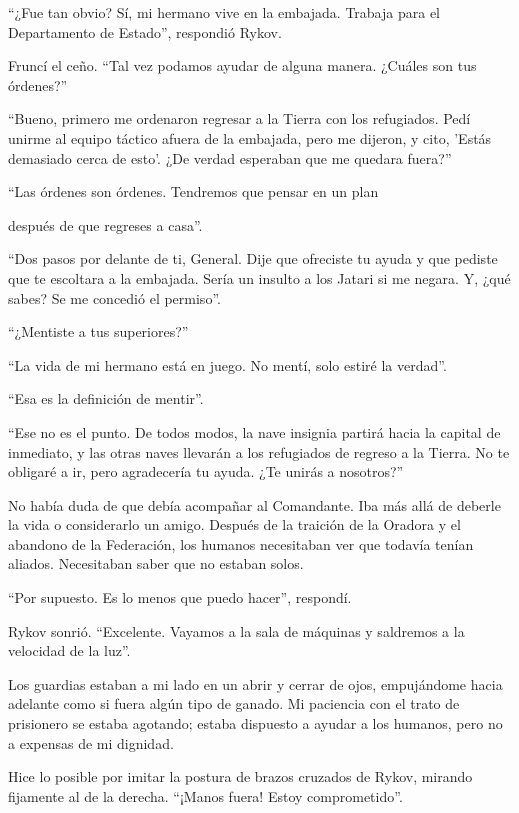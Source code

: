\documentclass[spanish,12pt,a4paper,oneside,titlepage]{book}
\begin{document}
    ``¿Fue tan obvio? Sí, mi hermano vive en la embajada. Trabaja para el Departamento de Estado'', respondió Rykov.

    Fruncí el ceño. ``Tal vez podamos ayudar de alguna manera. ¿Cuáles son tus órdenes?''

    ``Bueno, primero me ordenaron regresar a la Tierra con los refugiados. Pedí unirme al equipo táctico afuera de la embajada, pero me dijeron, y cito, 'Estás demasiado cerca de esto'. ¿De verdad esperaban que me quedara fuera?''

    ``Las órdenes son órdenes. Tendremos que pensar en un plan

    después de que regreses a casa''.

    ``Dos pasos por delante de ti, General. Dije que ofreciste tu ayuda y que pediste que te escoltara a la embajada. Sería un insulto a los Jatari si me negara. Y, ¿qué sabes? Se me concedió el permiso''.

    ``¿Mentiste a tus superiores?''

    ``La vida de mi hermano está en juego. No mentí, solo estiré la verdad''.

    ``Esa es la definición de mentir''.

    ``Ese no es el punto. De todos modos, la nave insignia partirá hacia la capital de inmediato, y las otras naves llevarán a los refugiados de regreso a la Tierra. No te obligaré a ir, pero agradecería tu ayuda. ¿Te unirás a nosotros?''

    No había duda de que debía acompañar al Comandante. Iba más allá de deberle la vida o considerarlo un amigo. Después de la traición de la Oradora y el abandono de la Federación, los humanos necesitaban ver que todavía tenían aliados. Necesitaban saber que no estaban solos.

    ``Por supuesto. Es lo menos que puedo hacer'', respondí.

    Rykov sonrió. ``Excelente. Vayamos a la sala de máquinas y saldremos a la velocidad de la luz''.

    Los guardias estaban a mi lado en un abrir y cerrar de ojos, empujándome hacia adelante como si fuera algún tipo de ganado. Mi paciencia con el trato de prisionero se estaba agotando; estaba dispuesto a ayudar a los humanos, pero no a expensas de mi dignidad.

    Hice lo posible por imitar la postura de brazos cruzados de Rykov, mirando fijamente al de la derecha. ``¡Manos fuera! Estoy comprometido''.
\end{document}
